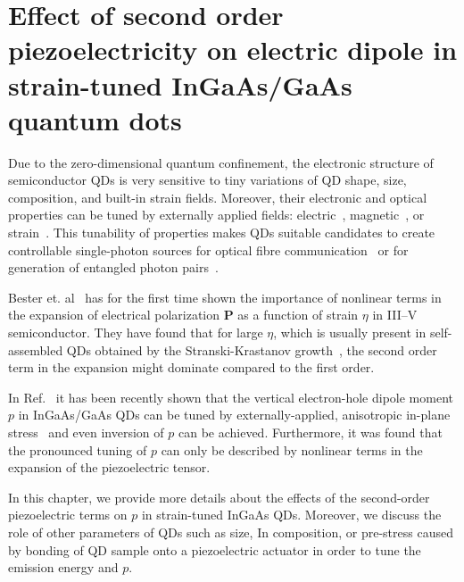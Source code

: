 
\chapter{Effect of second order piezoelectricity on electric dipole in strain-tuned InGaAs/GaAs quantum dots}\label{chap:2order_piezo}

Due to the zero-dimensional quantum confinement, the electronic structure of semiconductor QDs is very sensitive to tiny variations of QD shape, size, composition, and built-in strain fields.
%
%
Moreover, their electronic and optical properties can be tuned by externally applied fields: electric~\cite{Gerardot_2007, Vogel_2007}, magnetic~\cite{Stevenson_2006}, or strain~\citep{kleDresden}. This tunability of properties makes QDs suitable candidates to create controllable single-photon sources for optical fibre communication~\cite{Huffaker1998} or for generation of entangled photon pairs~\cite{Trotta:16}.

Bester et. al~\citep{Bester:06, Bester:06_2} has for the first time shown the importance of nonlinear terms in the expansion of electrical polarization $\mathbf{P}$ as a function of strain $\eta$ in III--V semiconductor. They have found that for large $\eta$, which is usually present in self-assembled QDs obtained by the Stranski-Krastanov growth~\cite{Grundmann}, the second order term in the expansion might dominate compared to the first order.

In Ref.~\cite{Aberl:17} it has been recently shown that the vertical electron-hole dipole moment $p$ in InGaAs/GaAs QDs can be tuned by externally-applied, anisotropic in-plane stress~\cite{Trotta:12,Trotta:13} and even inversion of $p$ can be achieved. Furthermore, it was found that the pronounced tuning of $p$ can only be described by nonlinear terms in the expansion of the piezoelectric tensor. 

In this chapter, we provide more details about the effects of the second-order piezoelectric terms on $p$ in strain-tuned InGaAs QDs. Moreover, we discuss the role of other parameters of QDs such as size, In composition, or pre-stress caused by bonding of QD sample onto a piezoelectric actuator in order to tune the emission energy and $p$. 

